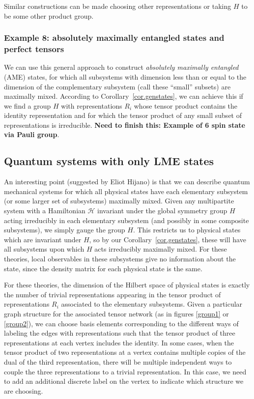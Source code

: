 \documentclass[12pt]{article}
\theoremstyle{definition}
\begin{document}
Similar constructions can be made choosing other representations or taking $H$ to be some other product group.

\subsubsection*{Example 8: absolutely maximally entangled states and perfect tensors}

We can use this general approach to construct {\it absolutely
maximally entangled} (AME) states, for which all subsystems with
dimension less than or equal to the dimension of the complementary
subsystem (call these ``small'' subsets) are maximally
mixed. According to Corollary~\ref{cor.genstates}, we can achieve this if we find a
group $H$ with representations $R_i$ whose tensor product contains the
identity representation and for which the tensor product of any small
subset of representations is irreducible. {\bf Need to finish this:
Example of 6 spin state via Pauli group}.

\subsection{Quantum systems with only LME states}

An interesting point (suggested by Eliot Hijano) is that we can describe quantum mechanical systems for which all physical states have each elementary subsystem (or some larger set of subsystems) maximally mixed. Given any multipartite system with a Hamiltonian ${\mathcal H}$ invariant under the global symmetry group $H$ acting irreducibly in each elementary subsystem (and possibly in some composite subsystems), we simply gauge the group $H$. This restricts us to physical states which are invariant under $H$, so by our Corollary~\ref{cor.genstates}, these will have all subsystems upon which $H$ acts irreducibly maximally mixed. For these theories, local observables in these subsystems give no information about the state, since the density matrix for each physical state is the same.

For these theories, the dimension of the Hilbert space of physical states is exactly the number of trivial representations appearing in the tensor product of representations $R_i$ associated to the elementary subsystems. Given a particular graph structure for the associated tensor network (as in figures \ref{group1} or \ref{group2}), we can choose basis elements corresponding to the different ways of labeling the edges with representations such that the tensor product of three representations at each vertex includes the identity. In some cases, when the tensor product of two representations at a vertex contains multiple copies of the dual of the third representation, there will be multiple independent ways to couple the three representations to a trivial representation. In this case, we need to add an additional discrete label on the vertex to indicate which structure we are choosing.
\end{document}
